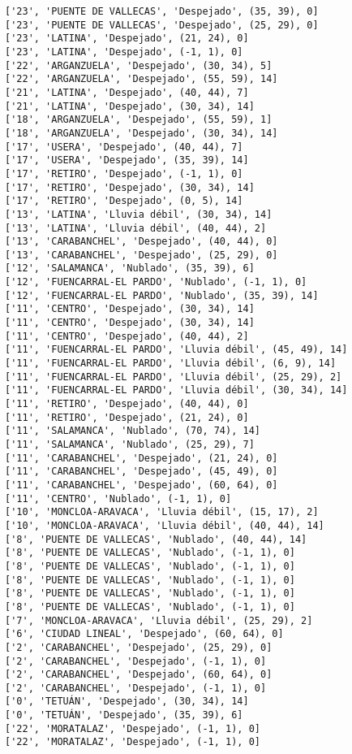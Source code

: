 \documentclass[11pt]{article}
\begin{document}
\begin{Verbatim}[commandchars=\\\{\}]
['23', 'PUENTE DE VALLECAS', 'Despejado', (35, 39), 0]
['23', 'PUENTE DE VALLECAS', 'Despejado', (25, 29), 0]
['23', 'LATINA', 'Despejado', (21, 24), 0]
['23', 'LATINA', 'Despejado', (-1, 1), 0]
['22', 'ARGANZUELA', 'Despejado', (30, 34), 5]
['22', 'ARGANZUELA', 'Despejado', (55, 59), 14]
['21', 'LATINA', 'Despejado', (40, 44), 7]
['21', 'LATINA', 'Despejado', (30, 34), 14]
['18', 'ARGANZUELA', 'Despejado', (55, 59), 1]
['18', 'ARGANZUELA', 'Despejado', (30, 34), 14]
['17', 'USERA', 'Despejado', (40, 44), 7]
['17', 'USERA', 'Despejado', (35, 39), 14]
['17', 'RETIRO', 'Despejado', (-1, 1), 0]
['17', 'RETIRO', 'Despejado', (30, 34), 14]
['17', 'RETIRO', 'Despejado', (0, 5), 14]
['13', 'LATINA', 'Lluvia débil', (30, 34), 14]
['13', 'LATINA', 'Lluvia débil', (40, 44), 2]
['13', 'CARABANCHEL', 'Despejado', (40, 44), 0]
['13', 'CARABANCHEL', 'Despejado', (25, 29), 0]
['12', 'SALAMANCA', 'Nublado', (35, 39), 6]
['12', 'FUENCARRAL-EL PARDO', 'Nublado', (-1, 1), 0]
['12', 'FUENCARRAL-EL PARDO', 'Nublado', (35, 39), 14]
['11', 'CENTRO', 'Despejado', (30, 34), 14]
['11', 'CENTRO', 'Despejado', (30, 34), 14]
['11', 'CENTRO', 'Despejado', (40, 44), 2]
['11', 'FUENCARRAL-EL PARDO', 'Lluvia débil', (45, 49), 14]
['11', 'FUENCARRAL-EL PARDO', 'Lluvia débil', (6, 9), 14]
['11', 'FUENCARRAL-EL PARDO', 'Lluvia débil', (25, 29), 2]
['11', 'FUENCARRAL-EL PARDO', 'Lluvia débil', (30, 34), 14]
['11', 'RETIRO', 'Despejado', (40, 44), 0]
['11', 'RETIRO', 'Despejado', (21, 24), 0]
['11', 'SALAMANCA', 'Nublado', (70, 74), 14]
['11', 'SALAMANCA', 'Nublado', (25, 29), 7]
['11', 'CARABANCHEL', 'Despejado', (21, 24), 0]
['11', 'CARABANCHEL', 'Despejado', (45, 49), 0]
['11', 'CARABANCHEL', 'Despejado', (60, 64), 0]
['11', 'CENTRO', 'Nublado', (-1, 1), 0]
['10', 'MONCLOA-ARAVACA', 'Lluvia débil', (15, 17), 2]
['10', 'MONCLOA-ARAVACA', 'Lluvia débil', (40, 44), 14]
['8', 'PUENTE DE VALLECAS', 'Nublado', (40, 44), 14]
['8', 'PUENTE DE VALLECAS', 'Nublado', (-1, 1), 0]
['8', 'PUENTE DE VALLECAS', 'Nublado', (-1, 1), 0]
['8', 'PUENTE DE VALLECAS', 'Nublado', (-1, 1), 0]
['8', 'PUENTE DE VALLECAS', 'Nublado', (-1, 1), 0]
['8', 'PUENTE DE VALLECAS', 'Nublado', (-1, 1), 0]
['7', 'MONCLOA-ARAVACA', 'Lluvia débil', (25, 29), 2]
['6', 'CIUDAD LINEAL', 'Despejado', (60, 64), 0]
['2', 'CARABANCHEL', 'Despejado', (25, 29), 0]
['2', 'CARABANCHEL', 'Despejado', (-1, 1), 0]
['2', 'CARABANCHEL', 'Despejado', (60, 64), 0]
['2', 'CARABANCHEL', 'Despejado', (-1, 1), 0]
['0', 'TETUÁN', 'Despejado', (30, 34), 14]
['0', 'TETUÁN', 'Despejado', (35, 39), 6]
['22', 'MORATALAZ', 'Despejado', (-1, 1), 0]
['22', 'MORATALAZ', 'Despejado', (-1, 1), 0]

\end{Verbatim}
\end{document}
